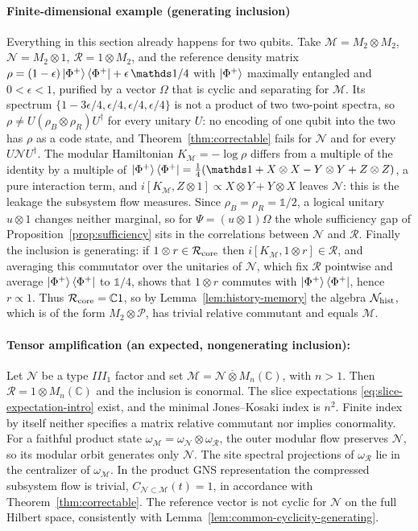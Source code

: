 \documentclass[a4paper,11pt]{article}
\theoremstyle{definition}
\let\mathbbm\mathds
\newcommand{\mR}{\mathcal{R}}
\newcommand{\mN}{\mathcal{N}}
\newcommand{\mM}{\mathcal{M}}
\begin{document}
\paragraph{Finite-dimensional example (generating inclusion)}
Everything in this section already happens for two qubits. Take $\mM=M_2\otimes M_2$, $\mN=M_2\otimes1$, $\mR=1\otimes M_2$, and the reference density matrix $\rho=(1-\epsilon)\ket{\Phi^+}\bra{\Phi^+}+\epsilon\,\mathbbm 1/4$ with $\ket{\Phi^+}$ maximally entangled and $0<\epsilon<1$, purified by a vector $\Omega$ that is cyclic and separating for $\mM$. Its spectrum $\{1-3\epsilon/4,\epsilon/4,\epsilon/4,\epsilon/4\}$ is not a product of two two-point spectra, so $\rho\ne U(\rho_B\otimes\rho_R)U^\dagger$ for every unitary $U$: no encoding of one qubit into the two has $\rho$ as a code state, and Theorem~\ref{thm:correctable} fails for $\mN$ and for every $U\mN U^\dagger$. The modular Hamiltonian $K_{\mM}=-\log\rho$ differs from a multiple of the identity by a multiple of $\ket{\Phi^+}\bra{\Phi^+}=\tfrac14(\mathbbm 1+X\otimes X-Y\otimes Y+Z\otimes Z)$, a pure interaction term, and $i[K_{\mM},Z\otimes1]\propto X\otimes Y+Y\otimes X$ leaves $\mN$: this is the leakage the subsystem flow measures. Since $\rho_B=\rho_R=\mathbbm 1/2$, a logical unitary $u\otimes1$ changes neither marginal, so for $\Psi=(u\otimes1)\Omega$ the whole sufficiency gap of Proposition~\ref{prop:sufficiency} sits in the correlations between $\mN$ and $\mR$. Finally the inclusion is generating: if $1\otimes r\in\mR_{\rm core}$ then $i[K_{\mM},1\otimes r]\in\mR$, and averaging this commutator over the unitaries of $\mN$, which fix $\mR$ pointwise and average $\ket{\Phi^+}\bra{\Phi^+}$ to $\mathbbm 1/4$, shows that $1\otimes r$ commutes with $\ket{\Phi^+}\bra{\Phi^+}$, hence $r\propto1$. Thus $\mR_{\rm core}=\mathbb C1$, so by Lemma~\ref{lem:history-memory} the algebra $\mN_{\rm hist}$, which is of the form $M_2\otimes\mathcal P$, has trivial relative commutant and equals $\mM$.

\paragraph{Tensor amplification (an expected, nongenerating inclusion):}
Let $\mN$ be a type $III_1$ factor and set $\mM=\mN\overline\otimes M_n(\mathbb C)$,
with $n>1$. Then $\mR=1\otimes M_n(\mathbb C)$ and the inclusion is conormal.
The slice expectations \eqref{eq:slice-expectation-intro} exist, and the minimal Jones--Kosaki index
is $n^2$. Finite index by itself neither specifies a matrix relative commutant
nor implies conormality.
For a faithful product state $\omega_{\mM}=\omega_{\mN}\otimes\omega_{\mR}$, the outer modular
flow preserves $\mN$, so its modular orbit generates only $\mN$.
The site spectral projections of $\omega_{\mR}$ lie in the centralizer of $\omega_{\mM}$.
In the product GNS representation the compressed subsystem flow is trivial, $C_{\mN\subset\mM}(t)=1$, in accordance with Theorem~\ref{thm:correctable}. The reference vector is not cyclic for $\mN$ on the full Hilbert
space, consistently with Lemma~\ref{lem:common-cyclicity-generating}.
\end{document}
